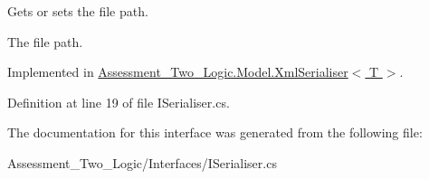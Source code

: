 Gets or sets the file path. 

The file path.

Implemented in \hyperlink{class_assessment___two___logic_1_1_model_1_1_xml_serialiser-g_a61f9ebf94a2429d72a4b4bfff95080ce}{Assessment\_\-Two\_\-Logic.Model.XmlSerialiser$<$ T $>$}.



Definition at line 19 of file ISerialiser.cs.



The documentation for this interface was generated from the following file:\begin{DoxyCompactItemize}
\item 
Assessment\_\-Two\_\-Logic/Interfaces/ISerialiser.cs\end{DoxyCompactItemize}
